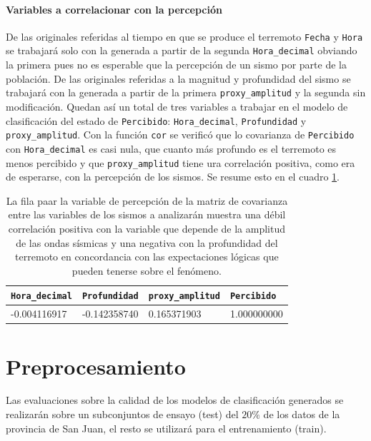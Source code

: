 \documentclass[a4paper]{report}
\begin{document}
\paragraph{Variables a correlacionar con la percepción}
De las originales referidas al tiempo en que se produce el terremoto \verb'Fecha' y \verb'Hora' se trabajará solo con la generada a partir de la segunda \verb'Hora_decimal' obviando la primera pues no es esperable que la percepción de un sismo por parte de la población.
De las originales referidas a la magnitud y profundidad del sismo se trabajará con la generada a partir de la primera \verb'proxy_amplitud' y la segunda sin modificación.
Quedan así un total de tres variables a trabajar en el modelo de clasificación del estado de \verb'Percibido': \verb'Hora_decimal', \verb'Profundidad' y  \verb'proxy_amplitud'.
Con la función \verb'cor' se verificó que lo covarianza de \verb'Percibido' con \verb'Hora_decimal' es casi nula, que cuanto más profundo es el terremoto es menos percibido y que \verb'proxy_amplitud' tiene ura correlación positiva, como era de esperarse, con la percepción de los sismos.
Se resume esto en el cuadro \ref{tab:correlaciones}.
\begin{table}[h]
\centering
\begin{tabular}{llll}
\toprule
\verb'Hora_decimal' & \verb'Profundidad'  & \verb'proxy_amplitud' & \verb'Percibido' \\ 
\midrule
-0.004116917  & -0.142358740  &  0.165371903 &   1.000000000 \\
\bottomrule
\end{tabular}
\caption{La fila paar la variable de percepción de la matriz de covarianza entre las variables de los sismos a analizarán muestra una débil correlación positiva con la variable que depende de la amplitud de las ondas sísmicas y una negativa con la profundidad del terremoto en concordancia con las expectaciones lógicas que pueden tenerse sobre el fenómeno.}
\label{tab:correlaciones}
\end{table}



\section{Preprocesamiento}


Las evaluaciones sobre la calidad de los modelos de clasificación generados se realizarán sobre un subconjuntos de ensayo (test) del \(20 \%\) de los datos de la provincia de San Juan, el resto se utilizará para el entrenamiento (train).
\end{document}
